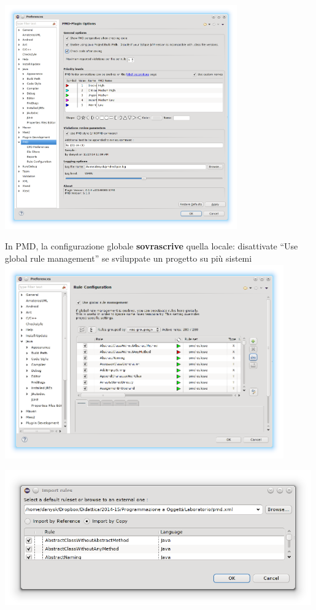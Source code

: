 \documentclass[presentation]{beamer}
\begin{document}
 {
	\centering
	\includegraphics[width=0.75\textwidth]{img/pmdconf}
}

 {
  In PMD, la configurazione globale \textbf{sovrascrive} quella locale: disattivate ``Use global rule management'' se sviluppate un progetto su più sistemi
  \centering
  \includegraphics[width=0.9\textwidth]{img/pmdconf1}
}

 {
	\centering
	\includegraphics[width=0.99\textwidth]{img/pmdimport}
}
\end{document}
